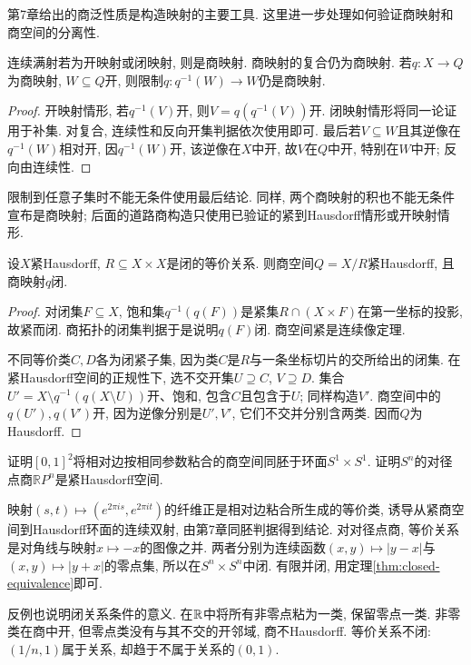 第7章给出的商泛性质是构造映射的主要工具. 这里进一步处理如何验证商映射和商空间的分离性.
\begin{proposition}\label{thm:quotient-open-closed}
连续满射若为开映射或闭映射, 则是商映射. 商映射的复合仍为商映射. 若$q:X\to Q$为商映射, $W\subseteq Q$开, 则限制$q:q^{-1}(W)\to W$仍是商映射.
\end{proposition}
\begin{proof}
开映射情形, 若$q^{-1}(V)$开, 则$V=q(q^{-1}(V))$开. 闭映射情形将同一论证用于补集. 对复合, 连续性和反向开集判据依次使用即可. 最后若$V\subseteq W$且其逆像在$q^{-1}(W)$相对开, 因$q^{-1}(W)$开, 该逆像在$X$中开, 故$V$在$Q$中开, 特别在$W$中开; 反向由连续性.
\end{proof}
限制到任意子集时不能无条件使用最后结论. 同样, 两个商映射的积也不能无条件宣布是商映射; 后面的道路商构造只使用已验证的紧到Hausdorff情形或开映射情形.

\begin{theorem}\label{thm:closed-equivalence}
设$X$紧Hausdorff, $R\subseteq X\times X$是闭的等价关系. 则商空间$Q=X/R$紧Hausdorff, 且商映射$q$闭.
\end{theorem}
\begin{proof}
对闭集$F\subseteq X$, 饱和集$q^{-1}(q(F))$是紧集$R\cap(X\times F)$在第一坐标的投影, 故紧而闭. 商拓扑的闭集判据于是说明$q(F)$闭. 商空间紧是连续像定理.

不同等价类$C,D$各为闭紧子集, 因为类$C$是$R$与一条坐标切片的交所给出的闭集. 在紧Hausdorff空间的正规性下, 选不交开集$U\supseteq C$, $V\supseteq D$. 集合$U'=X\setminus q^{-1}(q(X\setminus U))$开、饱和, 包含$C$且包含于$U$; 同样构造$V'$. 商空间中的$q(U'),q(V')$开, 因为逆像分别是$U',V'$, 它们不交并分别含两类. 因而$Q$为Hausdorff.
\end{proof}

\begin{example}
证明$[0,1]^2$将相对边按相同参数粘合的商空间同胚于环面$S^1\times S^1$. 证明$S^n$的对径点商$\mathbb RP^n$是紧Hausdorff空间.
\end{example}
\begin{solution}
映射$(s,t)\mapsto(e^{2\pi is},e^{2\pi it})$的纤维正是相对边粘合所生成的等价类, 诱导从紧商空间到Hausdorff环面的连续双射, 由第7章同胚判据得到结论. 对对径点商, 等价关系是对角线与映射$x\mapsto-x$的图像之并. 两者分别为连续函数$(x,y)\mapsto|y-x|$与$(x,y)\mapsto|y+x|$的零点集, 所以在$S^n\times S^n$中闭. 有限并闭, 用定理\ref{thm:closed-equivalence}即可.
\end{solution}
反例也说明闭关系条件的意义. 在$\mathbb R$中将所有非零点粘为一类, 保留零点一类. 非零类在商中开, 但零点类没有与其不交的开邻域, 商不Hausdorff. 等价关系不闭: $(1/n,1)$属于关系, 却趋于不属于关系的$(0,1)$.

